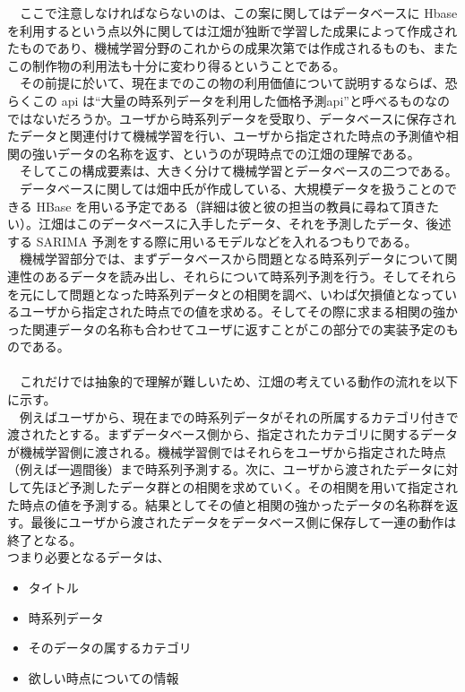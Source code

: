 \documentclass{scrartcl}
\begin{document}
　ここで注意しなければならないのは、この案に関してはデータベースに Hbase を利用するという点以外に関しては江畑が独断で学習した成果によって作成されたものであり、機械学習分野のこれからの成果次第では作成されるものも、またこの制作物の利用法も十分に変わり得るということである。\\
　その前提に於いて、現在までのこの物の利用価値について説明するならば、恐らくこの api は``大量の時系列データを利用した価格予測api''と呼べるものなのではないだろうか。ユーザから時系列データを受取り、データベースに保存されたデータと関連付けて機械学習を行い、ユーザから指定された時点の予測値や相関の強いデータの名称を返す、というのが現時点での江畑の理解である。\\
　そしてこの構成要素は、大きく分けて機械学習とデータベースの二つである。\\
　データベースに関しては畑中氏が作成している、大規模データを扱うことのできる HBase を用いる予定である（詳細は彼と彼の担当の教員に尋ねて頂きたい）。江畑はこのデータベースに入手したデータ、それを予測したデータ、後述する SARIMA 予測をする際に用いるモデルなどを入れるつもりである。\\
　機械学習部分では、まずデータベースから問題となる時系列データについて関連性のあるデータを読み出し、それらについて時系列予測を行う。そしてそれらを元にして問題となった時系列データとの相関を調べ、いわば欠損値となっているユーザから指定された時点での値を求める。そしてその際に求まる相関の強かった関連データの名称も合わせてユーザに返すことがこの部分での実装予定のものである。\\
　\\
　これだけでは抽象的で理解が難しいため、江畑の考えている動作の流れを以下に示す。\\
　例えばユーザから、現在までの時系列データがそれの所属するカテゴリ付きで渡されたとする。まずデータベース側から、指定されたカテゴリに関するデータが機械学習側に渡される。機械学習側ではそれらをユーザから指定された時点（例えば一週間後）まで時系列予測する。次に、ユーザから渡されたデータに対して先ほど予測したデータ群との相関を求めていく。その相関を用いて指定された時点の値を予測する。結果としてその値と相関の強かったデータの名称群を返す。最後にユーザから渡されたデータをデータベース側に保存して一連の動作は終了となる。\\

つまり必要となるデータは、\\
\begin{itemize}
\item タイトル\\
\item 時系列データ\\
\item そのデータの属するカテゴリ\\
\item 欲しい時点についての情報\\
\end{itemize}
\end{document}
